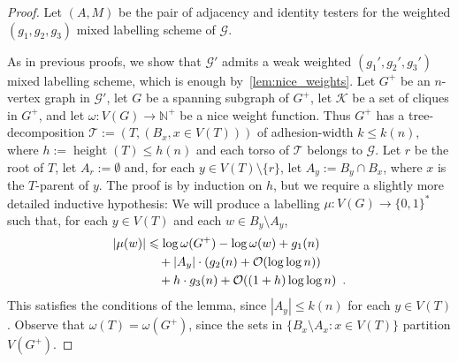 \documentclass{patmorin}
\renewcommand{\le}{\leqslant}
\newcommand{\pat}[1]{\textcolor{Magenta}{PaMo: #1}}
\DeclareMathOperator{\height}{height}
\newcommand{\NN}{\mathbb{N}}
\newcommand{\Oh}{\mathcal{O}}
\begin{document}
  \begin{proof}
    Let $(A,M)$ be the pair of adjacency and identity testers for the weighted $(g_1,g_2,g_3)$ mixed labelling scheme of $\mathcal{G}$.

    As in previous proofs,  we show that $\mathcal{G}'$ admits a weak weighted $(g_1',g_2',g_3')$ mixed labelling scheme, which is enough by~\cref{lem:nice_weights}.
    Let $G^+$ be an $n$-vertex graph in $\mathcal{G}'$, let $G$ be a spanning subgraph of $G^+$, let $\mathcal{K}$ be a set of cliques in $G^+$, and let $\omega:V(G)\to\NN^+$ be a nice weight function.
    Thus $G^+$ has a tree-decomposition $\mathcal{T}:=(T,(B_x,x\in V(T)))$ of adhesion-width $k\le k(n)$, where $h:=\height(T)\le h(n)$ and each torso of $\mathcal{T}$ belongs to $\mathcal{G}$.
    Let $r$ be the root of $T$, let $A_r:=\emptyset$ and, for each $y\in V(T)\setminus\{r\}$, let $A_y:=B_y\cap B_x$, where $x$ is the $T$-parent of $y$.
    The proof is by induction on $h$, but we require a slightly more detailed inductive hypothesis: We will produce a labelling $\mu:V(G)\to\{0,1\}^*$ such that, for each $y\in V(T)$ and each $w\in B_y\setminus A_y$,
    \begin{align}
       |\mu(w)|
       & \le \log \omega(G^+) - \log \omega(w) + g_1(n) \notag \\
       & \quad {} + |A_y|\cdot (g_2(n) + \Oh(\log\log n)) \label{strong_strong} \\
       & \quad {} + h\cdot g_3(n) + \Oh((1+h)\log\log n) \enspace . \notag
    \end{align}
    This satisfies the conditions of the lemma, since $|A_y|\le k(n)$ for each $y\in V(T)$.
    Observe that $\omega(T)=\omega(G^+)$, since the sets in $\{B_x\setminus A_x:x\in V(T)\}$ partition $V(G^+)$.


\end{proof}
\end{document}
